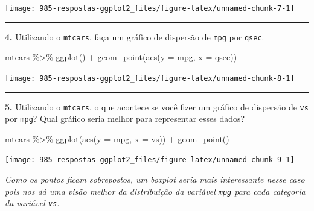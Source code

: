 \documentclass[
]{book}
\newenvironment{Shaded}{\begin{snugshade}}{\end{snugshade}}
\newcommand{\AttributeTok}[1]{\textcolor[rgb]{0.77,0.63,0.00}{#1}}
\newcommand{\FunctionTok}[1]{\textcolor[rgb]{0.00,0.00,0.00}{#1}}
\newcommand{\NormalTok}[1]{#1}
\newcommand{\SpecialCharTok}[1]{\textcolor[rgb]{0.00,0.00,0.00}{#1}}
\begin{document}
\begin{center}\texttt{[image: 985-respostas-ggplot2\_files/figure-latex/unnamed-chunk-7-1]} \end{center}

\begin{center}\rule{0.5\linewidth}{0.5pt}\end{center}

\textbf{4.} Utilizando o \texttt{mtcars}, faça um gráfico de dispersão de \texttt{mpg} por \texttt{qsec}.

\begin{Shaded}
\begin{Highlighting}[]
\NormalTok{mtcars }\SpecialCharTok{\%\textgreater{}\%} 
  \FunctionTok{ggplot}\NormalTok{() }\SpecialCharTok{+}
  \FunctionTok{geom\_point}\NormalTok{(}\FunctionTok{aes}\NormalTok{(}\AttributeTok{y =}\NormalTok{ mpg, }\AttributeTok{x =}\NormalTok{ qsec))}
\end{Highlighting}
\end{Shaded}

\begin{center}\texttt{[image: 985-respostas-ggplot2\_files/figure-latex/unnamed-chunk-8-1]} \end{center}

\begin{center}\rule{0.5\linewidth}{0.5pt}\end{center}

\textbf{5.} Utilizando o \texttt{mtcars}, o que acontece se você fizer um gráfico de dispersão de \texttt{vs} por \texttt{mpg}? Qual gráfico seria melhor para representar esses dados?

\begin{Shaded}
\begin{Highlighting}[]
\NormalTok{mtcars }\SpecialCharTok{\%\textgreater{}\%} 
  \FunctionTok{ggplot}\NormalTok{(}\FunctionTok{aes}\NormalTok{(}\AttributeTok{y =}\NormalTok{ mpg, }\AttributeTok{x =}\NormalTok{ vs)) }\SpecialCharTok{+}
  \FunctionTok{geom\_point}\NormalTok{()}
\end{Highlighting}
\end{Shaded}

\begin{center}\texttt{[image: 985-respostas-ggplot2\_files/figure-latex/unnamed-chunk-9-1]} \end{center}

\emph{Como os pontos ficam sobrepostos, um boxplot seria mais interessante nesse caso pois nos dá uma visão melhor da distribuição da variável \texttt{mpg} para cada categoria da variável \texttt{vs}.}
\end{document}
